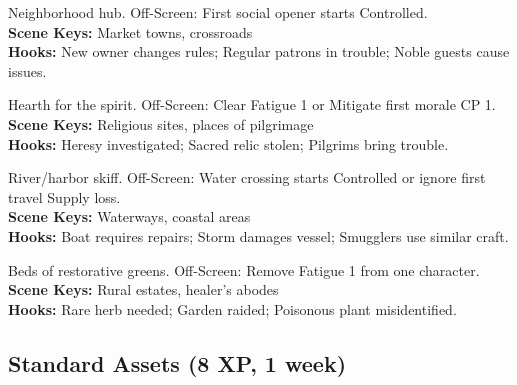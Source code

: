 \documentclass[12pt]{article}
\begin{document}
\begin{description}[leftmargin=*]
  \item[\textbf{Local Tavern/Inn}] Neighborhood hub. Off-Screen: First social opener starts Controlled. \\
  \textbf{Scene Keys:} Market towns, crossroads \\
  \textbf{Hooks:} New owner changes rules; Regular patrons in trouble; Noble guests cause issues.

  \item[\textbf{Minor Shrine/Temple}] Hearth for the spirit. Off-Screen: Clear Fatigue 1 or Mitigate first morale CP 1. \\
  \textbf{Scene Keys:} Religious sites, places of pilgrimage \\
  \textbf{Hooks:} Heresy investigated; Sacred relic stolen; Pilgrims bring trouble.

  \item[\textbf{Fishing Boat/Barge}] River/harbor skiff. Off-Screen: Water crossing starts Controlled or ignore first travel Supply loss. \\
  \textbf{Scene Keys:} Waterways, coastal areas \\
  \textbf{Hooks:} Boat requires repairs; Storm damages vessel; Smugglers use similar craft.

  \item[\textbf{Herbal Garden}] Beds of restorative greens. Off-Screen: Remove Fatigue 1 from one character. \\
  \textbf{Scene Keys:} Rural estates, healer's abodes \\
  \textbf{Hooks:} Rare herb needed; Garden raided; Poisonous plant misidentified.
\end{description}

\subsection*{Standard Assets (8 XP, 1 week)}
\end{document}
